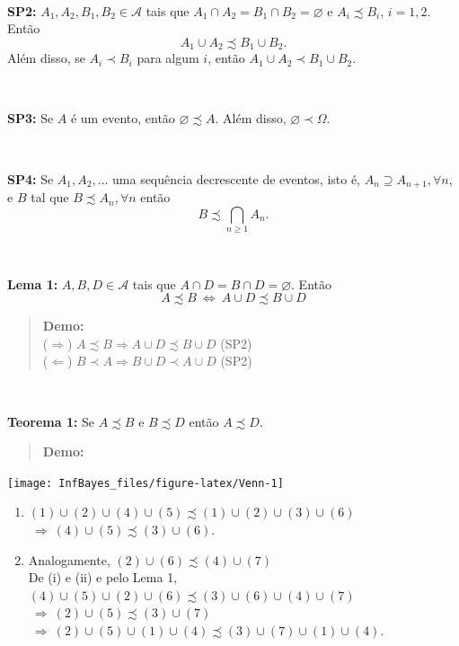 \documentclass[
]{book}
\providecommand{\tightlist}{%
  \setlength{\itemsep}{0pt}\setlength{\parskip}{0pt}}
\begin{document}
\(~\)

\textbf{SP2:} \(A_1, A_2, B_1, B_2 \in \mathcal{A}\) tais que \(A_1 \cap A_2 = B_1 \cap B_2 = \varnothing\) e \(A_i \precsim B_i\), \(i=1,2\). Então
\[A_1 \cup A_2 \precsim B_1 \cup B_2 .\]
Além disso, se \(A_i \prec B_i\) para algum \(i\), então \(A_1 \cup A_2 \prec B_1 \cup B_2 .\)

\(~\)

\textbf{SP3:} Se \(A\) é um evento, então \(\varnothing \precsim A\). Além disso, \(\varnothing \prec \Omega\).

\(~\)

\textbf{SP4:} Se \(A_1, A_2, \ldots\) uma sequência decrescente de eventos, isto é, \(A_n \supseteq A_{n+1}, \forall n\), e \(B\) tal que \(B \precsim A_n, \forall n\) então \[B \precsim \bigcap_{n \geq 1} A_n.\]

\(~\)

\textbf{Lema 1:} \(A, B, D \in \mathcal{A}\) tais que \(A \cap D = B \cap D = \varnothing\). Então \[A \precsim B ~\Leftrightarrow~ A \cup D \precsim B \cup D\]

\begin{quote}
\textbf{Demo:}\\
(\(\Rightarrow\)) \(A \precsim B \Rightarrow A \cup D \precsim B \cup D\) (SP2)\\
(\(\Leftarrow\)) \(B \prec A \Rightarrow B \cup D \prec A \cup D\) (SP2)
\end{quote}

\(~\)

\textbf{Teorema 1:} Se \(A \precsim B\) e \(B \precsim D\) então \(A \precsim D\).

\begin{quote}
\textbf{Demo:}
\end{quote}

\begin{center}\texttt{[image: InfBayes\_files/figure-latex/Venn-1]} \end{center}

\begin{enumerate}
\def\labelenumi{(\roman{enumi})}
\tightlist
\item
  \((1) \cup (2) \cup (4) \cup (5) \precsim (1) \cup (2) \cup (3) \cup (6)\) \(~\Rightarrow~ (4) \cup (5) \precsim (3) \cup (6)\).\\
\item
  Analogamente, \((2) \cup (6) \precsim (4) \cup (7)\)\\
  De (i) e (ii) e pelo Lema 1, \((4) \cup (5) \cup (2) \cup (6) \precsim (3) \cup (6) \cup (4) \cup (7)\)\\
  \(~\Rightarrow~ (2) \cup (5) \precsim (3) \cup (7)\) \({~\Rightarrow~ (2) \cup (5) \cup (1) \cup(4) \precsim (3) \cup (7) \cup (1) \cup(4)}\).
\end{enumerate}
\end{document}
